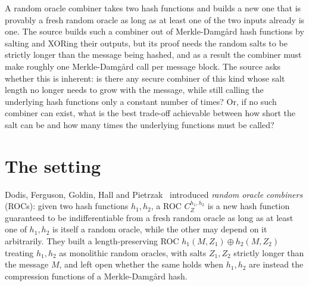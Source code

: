 \documentclass{aicr-conjecture}
\newcommand{\Z}{Z}
\begin{document}

\vspace{0.4em}

\begin{informalconjecture}
A random oracle combiner takes two hash functions and builds a new one
that is provably a fresh random oracle as long as at least one of the
two inputs already is one. The source builds such a combiner out of
Merkle-Damg\r{a}rd hash functions by salting and XORing their outputs,
but its proof needs the random salts to be strictly longer than the
message being hashed, and as a result the combiner must make roughly
one Merkle-Damg\r{a}rd call per message block. The source asks whether
this is inherent: is there any secure combiner of this kind whose salt
length no longer needs to grow with the message, while still calling
the underlying hash functions only a constant number of times? Or, if
no such combiner can exist, what is the best trade-off achievable
between how short the salt can be and how many times the underlying
functions must be called?
\end{informalconjecture}

\section{The setting}\label{sec:setting}

Dodis, Ferguson, Goldin, Hall and Pietrzak~\cite{DFGHP23} introduced
\emph{random oracle combiners} (ROCs): given two hash functions
$h_{1}, h_{2}$, a ROC $C^{h_{1},h_{2}}_{\Z}$ is a new hash function
guaranteed to be indifferentiable from a fresh random oracle as long as
at least one of $h_{1}, h_{2}$ is itself a random oracle, while the
other may depend on it arbitrarily. They built a length-preserving ROC
$h_{1}(M, \Z_{1}) \oplus h_{2}(M, \Z_{2})$ treating $h_{1}, h_{2}$ as
monolithic random oracles, with salts $\Z_{1}, \Z_{2}$ strictly longer
than the message $M$, and left open whether the same holds when
$h_{1}, h_{2}$ are instead the compression functions of a
Merkle-Damg\r{a}rd hash.
\end{document}

